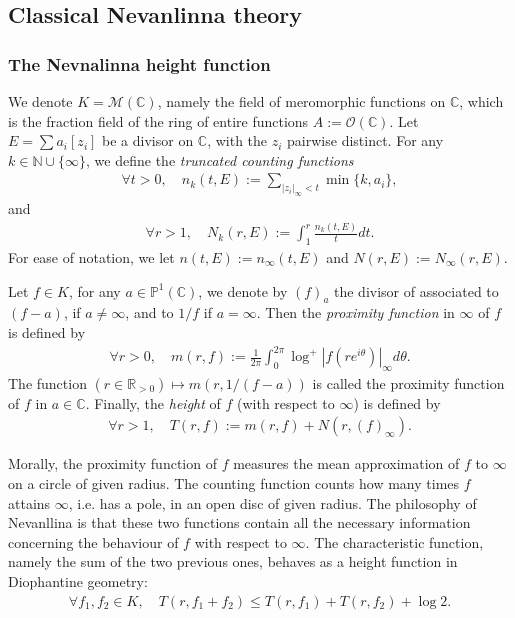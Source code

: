 \documentclass [11pt,reqno]{amsart}
\def\bC{{\mathbb{C}}}
\def\bN{{\mathbb{N}}}
\def\bP{{\mathbb{P}}}
\def\bR{{\mathbb{R}}}
\newcommand{\1}{\mathmybb{1}}
\def\cM{{\mathcal{M}}}
\def\cO{{\mathcal{O}}}
\begin{document}
\subsection{Classical Nevanlinna theory}

\subsubsection{The Nevnalinna height function}

We denote $K=\cM(\bC)$, namely the field of meromorphic functions on $\bC$, which is the fraction field of the ring of entire functions $A:=\cO(\bC)$. Let $E = \sum a_i [z_i]$ be a divisor on $\bC$, with the $z_i$ pairwise distinct. For any $k\in \bN \cup\{\infty\}$, we define the \emph{truncated counting functions} 
\begin{align*}
\forall t >0,\quad n_k(t,E) := \displaystyle\sum_{|z_i|_{\infty} < t} \min\{k,a_i\},
\end{align*} 
and
\begin{align*}
\forall r>1,\quad N_k(r,E) := \int_{1}^{r} \frac{n_k(t,E)}{t} dt.
\end{align*}
For ease of notation, we let $n(t,E) := n_{\infty}(t,E)$ and $N(r,E) := N_{\infty}(r,E)$.

Let $f\in K$, for any $a\in \bP^1(\bC)$, we denote by $(f)_a$ the divisor of associated to $(f-a)$, if $a\neq \infty$, and to $1/f$ if $a=\infty$. Then the \emph{proximity function} in $\infty$ of $f$ is defined by
\begin{align*}
\forall r>0,\quad m(r,f) := \frac{1}{2\pi}\int_{0}^{2\pi} \log^{+}|f(re^{i\theta})|_{\infty}d\theta.
\end{align*}
The function $(r\in\bR_{>0})\mapsto m(r,1/(f-a))$ is called the proximity function of $f$ in $a\in\bC$. Finally, the \emph{height} of $f$ (with respect to $\infty$) is defined by
\begin{align*}
\forall r>1,\quad T(r,f) := m(r,f) + N(r,(f)_{\infty}).
\end{align*}

Morally, the proximity function of $f$ measures the mean approximation of $f$ to $\infty$ on a circle of given radius. The counting function counts how many times $f$ attains $\infty$, i.e. has a pole, in an open disc of given radius. The philosophy of Nevanllina is that these two functions contain all the necessary information concerning the behaviour of $f$ with respect to $\infty$. The characteristic function, namely the sum of the two previous ones, behaves as a height function in Diophantine geometry:
\begin{align*}
\forall f_1,f_2\in K,\quad T(r,f_1+f_2) \leq T(r,f_1) + T(r,f_2) + \log 2.
\end{align*}
\end{document}
